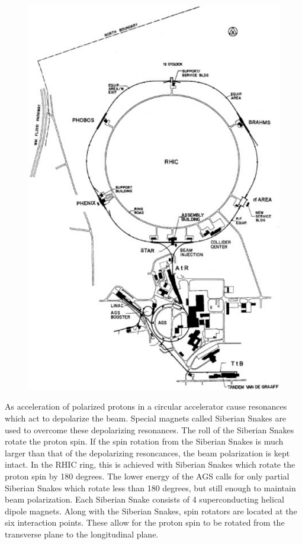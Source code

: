 \documentclass[abstract = on,listof=totoc, bibliography=totoc]{scrreprt}
\begin{document}
 \begin{figure}
\begin{center}
\includegraphics[width = 1\textwidth]{rhicBNL}
\caption[The RHIC complex]{}
\label{fig:rhic}
\end{center}
\end{figure}


As acceleration of polarized protons in a circular accelerator cause resonances which act to depolarize the beam. Special magnets called Siberian Snakes are used to overcome these depolarizing resonances. The roll of the Siberian Snakes rotate the proton spin. If the spin rotation from the Siberian Snakes is much larger than that of the depolarizing resoncances, the beam polarization is kept intact. In the RHIC ring, this is achieved with Siberian Snakes which rotate the proton spin by 180 degrees. The lower energy of the AGS calls for only partial Siberian Snakes which rotate less than 180 degrees, but still enough to maintain beam polarization. \cite{ppCollider}
Each Siberian Snake consists of 4 superconducting helical dipole magnets. Along with the Siberian Snakes, spin rotators are located at the six interaction points. These allow for the proton spin to be rotated from the transverse plane to the longitudinal plane.  \cite{ppCollider}
\end{document}
